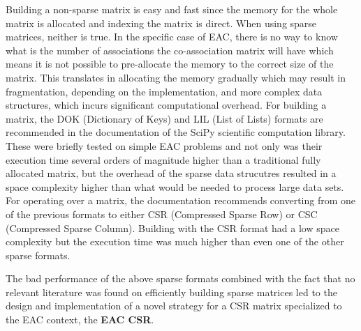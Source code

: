 Building a non-sparse matrix is easy and fast since the memory for the whole matrix is allocated and indexing the matrix is direct.
When using sparse matrices, neither is true.
In the specific case of EAC, there is no way to know what is the number of associations the co-association matrix will have which means it is not possible to pre-allocate the memory to the correct size of the matrix.
This translates in allocating the memory gradually which may result in fragmentation, depending on the implementation, and more complex data structures, which incurs significant computational overhead.
For building a matrix, the DOK (Dictionary of Keys) and LIL (List of Lists) formats are recommended in the documentation of the SciPy \cite{JonesSciPy} scientific computation library.
These were briefly tested on simple EAC problems and not only was their execution time several orders of magnitude higher than a traditional fully allocated matrix, but the overhead of the sparse data strucutres resulted in a space complexity higher than what would be needed to process large data sets.
For operating over a matrix, the documentation recommends converting from one of the previous formats to either CSR (Compressed Sparse Row) or CSC (Compressed Sparse Column).
Building with the CSR format had a low space complexity but the execution time was much higher than even one of the other sparse formats.

The bad performance of the above sparse formats combined with the fact that no relevant literature was found on efficiently building sparse matrices led to the design and implementation of a novel strategy for a CSR matrix specialized to the EAC context, the \textbf{EAC CSR}.



